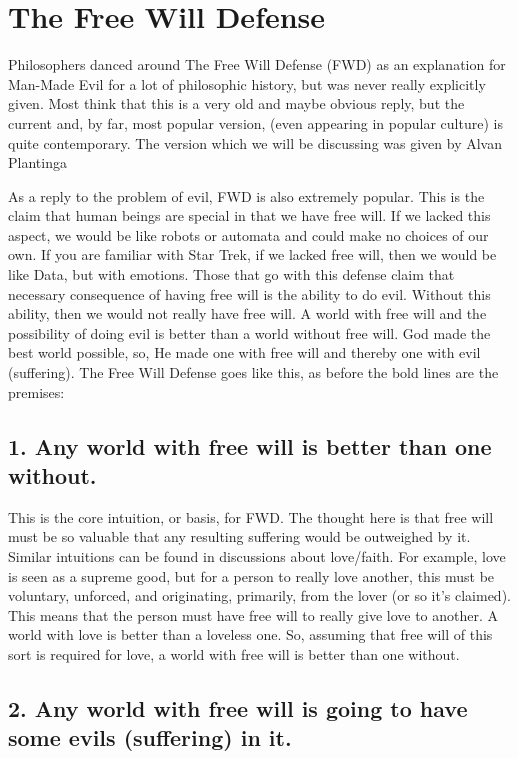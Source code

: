 \section{The Free Will Defense}
Philosophers danced around The Free Will Defense (FWD) as an explanation for Man-Made Evil for a lot of philosophic history, but was never really explicitly given. Most think that this is a very old and maybe obvious reply, but the current and,  by far, most popular version, (even appearing in popular culture) is quite contemporary. The version which we will be discussing was given by Alvan Plantinga\autocite{Plantinga1}

As a reply to the problem of evil, FWD is also extremely popular. This is the claim that human beings are special in that we have free will. If we lacked this aspect, we would be like robots or automata and could make no choices of our own. If you are familiar with Star Trek, if we lacked free will, then we would be like Data, but with emotions. Those that go with this defense claim that  necessary consequence of having free will is the ability to do evil. Without this ability, then we would not really have free will.  A world with free will and the possibility of doing evil is better than a world without free will. God made the best world possible, so, He made one with free will and thereby one with evil (suffering). The Free Will Defense goes like this, as before the bold lines are the premises:

\subsection{1. Any world with free will is better than one without.}

This is the core intuition, or basis, for FWD. The thought here is that free will must be so valuable that any resulting suffering would be outweighed by it. Similar intuitions can be found in discussions about love/faith. For example, love is seen as a supreme good, but for a person to really love another, this must be voluntary, unforced, and originating, primarily, from the lover (or so it's claimed). This means that the person must have free will to really give love to another. A world with love is better than a loveless one. So, assuming that free will of this sort is required for love, a world with free will is better than one without.  

\subsection{2. Any world with free will is going to have some evils (suffering) in it.}

